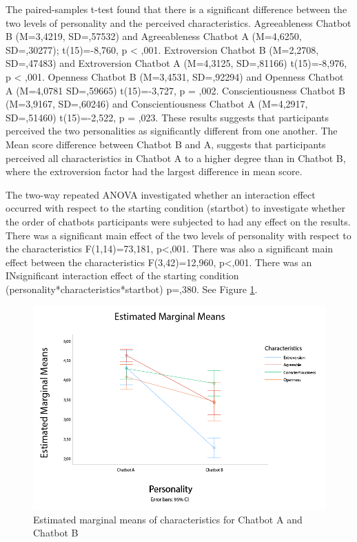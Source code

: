 The paired-samples t-test found that there is a significant difference between the two levels of personality and the perceived characteristics. Agreeableness Chatbot B (M=3,4219, SD=,57532) and Agreeableness Chatbot A (M=4,6250, SD=,30277); t(15)=-8,760, p < ,001. Extroversion Chatbot B (M=2,2708, SD=,47483) and Extroversion Chatbot A (M=4,3125, SD=,81166) t(15)=-8,976, p < ,001. Openness Chatbot B (M=3,4531, SD=,92294) and Openness Chatbot A (M=4,0781 SD=,59665) t(15)=-3,727, p = ,002. Conscientiousness Chatbot B (M=3,9167, SD=,60246) and Conscientiousness Chatbot A (M=4,2917, SD=,51460) t(15)=-2,522, p = ,023. These results suggests that participants perceived the two personalities as significantly different from one another. The Mean score difference between Chatbot B and A, suggests that participants perceived all characteristics in Chatbot A to a higher degree than in Chatbot B, where the extroversion factor had the largest difference in mean score.

The two-way repeated ANOVA investigated whether an interaction effect occurred with respect to the starting condition (startbot) to investigate whether the order of chatbots participants were subjected to had any effect on the results. There was a significant main effect of the two levels of personality with respect to the characteristics F(1,14)=73,181, p<,001. There was also a significant main effect between the characteristics F(3,42)=12,960, p<,001. There was an INsignificant interaction effect of the starting condition (personality*characteristics*startbot) p=,380. See Figure \ref{fig:charactmeanAB}.

\begin{figure}[H]
    \centering
    \includegraphics[scale=0.4]{figures/MeansLineCharacteristics.png}
    \caption{Estimated marginal means of characteristics for Chatbot A and Chatbot B}
    \label{fig:charactmeanAB}
\end{figure}

